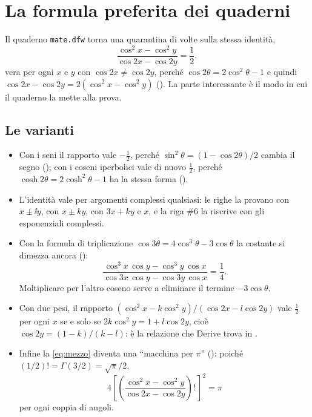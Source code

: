 \section{La formula preferita dei quaderni}
\label{sec:mezzo}

Il quaderno \texttt{mate.dfw} torna una quarantina di volte sulla stessa
identit\`a,
\begin{equation}\label{eq:mezzo}
  \frac{\cos^2x-\cos^2y}{\cos2x-\cos2y}=\frac12 ,
\end{equation}
vera per ogni $x$ e $y$ con $\cos2x\neq\cos2y$, perch\'e $\cos2\theta=2\cos^2\theta-1$
e quindi $\cos2x-\cos2y=2(\cos^2x-\cos^2y)$ (). La parte
interessante \`e il modo in cui il quaderno la mette alla prova.

\subsection{Le varianti}

\begin{itemize}[leftmargin=1.4em,itemsep=2pt]
  \item Con i seni il rapporto vale $-\tfrac12$, perch\'e
        $\sin^2\theta=(1-\cos2\theta)/2$ cambia il segno ();
        con i coseni iperbolici vale di nuovo $\tfrac12$, perch\'e
        $\cosh2\theta=2\cosh^2\theta-1$ ha la stessa forma ().
  \item L'identit\`a vale per argomenti complessi qualsiasi: le righe
         la provano con $x\pm\ii y$, con $x\pm ky$, con
        $3x+ky$ e $x$, e la riga \#6 la riscrive con gli esponenziali complessi.
  \item Con la formula di triplicazione $\cos3\theta=4\cos^3\theta-3\cos\theta$
        la costante si dimezza ancora ():
        \begin{equation}\label{eq:quarto}
          \frac{\cos^3x\,\cos y-\cos^3y\,\cos x}{\cos3x\,\cos y-\cos3y\,\cos x}=\frac14 .
        \end{equation}
        Moltiplicare per l'altro coseno serve a eliminare il termine
        $-3\cos\theta$.
  \item Con due pesi, il rapporto
        $(\cos^2x-k\cos^2y)/(\cos2x-l\cos2y)$ vale $\tfrac12$ per ogni $x$ se e
        solo se $2k\cos^2y=1+l\cos2y$, cio\`e $\cos2y=(1-k)/(k-l)$: \`e la
        relazione che Derive trova in .
  \item Infine la \eqref{eq:mezzo} diventa una ``macchina per $\pi$''
        (): poich\'e $(1/2)!=\Gamma(3/2)=\sqrt\pi/2$,
        \[
          4\left[\left(\frac{\cos^2x-\cos^2y}{\cos2x-\cos2y}\right)!\,\right]^2=\pi
        \]
        per ogni coppia di angoli.
\end{itemize}

